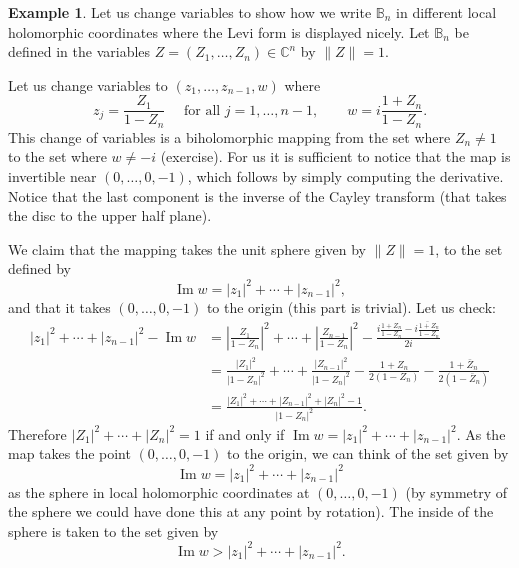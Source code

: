 \documentclass[12pt,openany]{book}
\renewcommand{\Im}{\operatorname{Im}}
\newcommand{\sabs}[1]{\lvert {#1} \rvert}
\newcommand{\snorm}[1]{\lVert {#1} \rVert}
\newcommand{\abs}[1]{\left\lvert {#1} \right\rvert}
\newcommand{\C}{{\mathbb{C}}}
\newcommand{\bB}{{\mathbb{B}}}
\theoremstyle{plain}
\theoremstyle{remark}
\theoremstyle{definition}
\theoremstyle{exercise}
\theoremstyle{example}
\newtheorem{example}[thm]{Example}
\begin{document}
\begin{example}
Let us change variables to show how we write $\bB_n$ in different
local holomorphic coordinates where the Levi form is displayed nicely.
Let $\bB_n$ be defined in the variables $Z = (Z_1,\ldots,Z_n) \in \C^n$
by $\snorm{Z} = 1$.

Let us change variables 
to $(z_1,\ldots,z_{n-1},w)$ where
\begin{equation*}
z_j = \frac{Z_1}{1-Z_n} \quad \text{ for all $j=1,\ldots,n-1$}, \qquad
w = i\frac{1+Z_n}{1-Z_n} .
\end{equation*}
This change of variables is a biholomorphic mapping from the set where $Z_n \not= 1$
to the set where $w\not= -i$ (exercise).  For us it is 
sufficient to notice that the map is invertible near
$(0,\ldots,0,-1)$, which follows by simply computing the derivative.
Notice
that the last component is the inverse of the Cayley transform (that takes
the disc to the upper half plane).

We claim that the mapping takes the unit sphere given by $\snorm{Z} = 1$, to
the set defined by
\begin{equation*}
\Im w = \sabs{z_1}^2 + \cdots + \sabs{z_{n-1}}^2 ,
\end{equation*}
and that it takes $(0,\ldots,0,-1)$ to the origin (this part is trivial).
Let us check:
\begin{equation*}
\begin{split}
\sabs{z_1}^2 + \cdots + \sabs{z_{n-1}}^2 - \Im w
& =
\abs{\frac{Z_1}{1-Z_n}}^2
+ \cdots +
\abs{\frac{Z_{n-1}}{1-Z_n}}^2
-
\frac{
i\frac{1+Z_n}{1-Z_n} -
\overline{
i\frac{1+Z_n}{1-Z_n}}
}{2i}
\\
& =
\frac{\sabs{Z_1}^2}{\sabs{1-Z_n}^2}
+ \cdots +
\frac{\sabs{Z_{n-1}}^2}{\sabs{1-Z_n}^2}
-
\frac{1+Z_n}{2(1-Z_n)} -
\frac{1+\bar{Z}_n}{2(1-\bar{Z}_n)}
\\
& = 
\frac{\sabs{Z_1}^2 %
+ \cdots +
\sabs{Z_{n-1}}^2 %
+
\sabs{Z_n}^2-1}{\sabs{1-Z_n}^2} .
\end{split}
\end{equation*}
Therefore $\sabs{Z_1}^2 + \cdots + \sabs{Z_n}^2 = 1$ if and only if $\Im w =
\sabs{z_1}^2 + \cdots + \sabs{z_{n-1}}^2$.
As the map takes the point $(0,\ldots,0,-1)$ to the origin, we can
think of the set given by
\begin{equation*}
\Im w = \sabs{z_1}^2 + \cdots + \sabs{z_{n-1}}^2 
\end{equation*}
as the sphere in local holomorphic coordinates at $(0,\ldots,0,-1)$ (by symmetry
of the sphere we could have done this at any point by rotation).
The inside of the sphere is taken to the set given by
\begin{equation*}
\Im w > \sabs{z_1}^2 + \cdots + \sabs{z_{n-1}}^2 .
\end{equation*}


\end{example}
\end{document}
